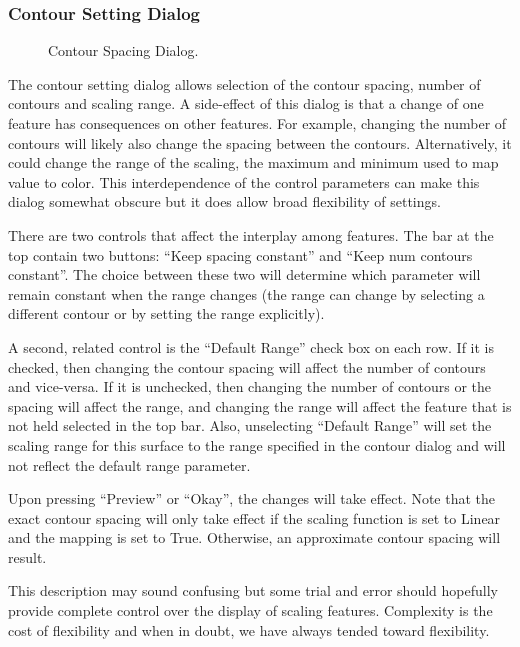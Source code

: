 \subsubsection{Contour Setting Dialog}
\label{sec:contourwindow}

\begin{figure}[htb]
  \begin{makeimage}
  \end{makeimage}
  \contourdialog
  \caption{\label{fig:contourdialog} Contour Spacing Dialog.}
\end{figure}

The contour setting dialog allows selection of the contour spacing, number
of contours and scaling range.  A side-effect of this dialog is that a
change of one feature has consequences on other features.  For example,
changing the number of contours will likely also change the spacing between
the contours.  Alternatively, it could change the range of the scaling,
\ie{} the maximum and minimum used to map value to color.  This
interdependence of the control parameters can make this dialog somewhat
obscure but it does allow broad flexibility of settings.

There are two controls that affect the interplay among features.  The bar
at the top contain two buttons: ``Keep spacing constant'' and ``Keep num
contours constant''.  The choice between these two will determine which
parameter will remain constant when the range changes (the range can change
by selecting a different contour or by setting the range explicitly).

A second, related control is the ``Default Range'' check box on each row.
If it is checked, then changing the contour spacing will affect the number
of contours and vice-versa.  If it is unchecked, then changing the number
of contours or the spacing will affect the range, and changing the range
will affect the feature that is not held selected in the top bar.  Also,
unselecting ``Default Range'' will set the scaling range for this surface
to the range specified in the contour dialog and will not reflect the
default range parameter.

Upon pressing ``Preview'' or ``Okay'', the changes will take effect.  Note that
the exact contour spacing will only take effect if the scaling function is 
set to Linear and the mapping is set to True.  Otherwise, an approximate 
contour spacing will result. 

This description may sound confusing but some trial and error should
hopefully provide complete control over the display of scaling features.
Complexity is the cost of flexibility and when in doubt, we have always
tended toward flexibility. 



